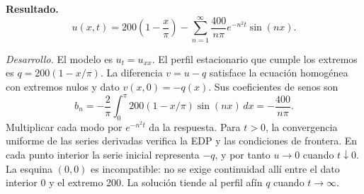 \noindent\textbf{Resultado.} \[u(x,t)=200\left(1-\frac x\pi\right)-\sum_{n=1}^{\infty}\frac{400}{n\pi}e^{-n^2t}\sin(nx).\]

\noindent\textit{Desarrollo.} El modelo es $u_t=u_{xx}$. El perfil estacionario que cumple los extremos es $q=200(1-x/\pi)$. La diferencia $v=u-q$ satisface la ecuación homogénea con extremos nulos y dato $v(x,0)=-q(x)$. Sus coeficientes de senos son \[b_n=-\frac2\pi\int_0^\pi200(1-x/\pi)\sin(nx)\,dx=-\frac{400}{n\pi}.\] Multiplicar cada modo por $e^{-n^2t}$ da la respuesta. Para $t>0$, la convergencia uniforme de las series derivadas verifica la EDP y las condiciones de frontera. En cada punto interior la serie inicial representa $-q$, y por tanto $u\to0$ cuando $t\downarrow0$. La esquina $(0,0)$ es incompatible: no se exige continuidad allí entre el dato interior 0 y el extremo 200. La solución tiende al perfil afín $q$ cuando $t\to\infty$.
